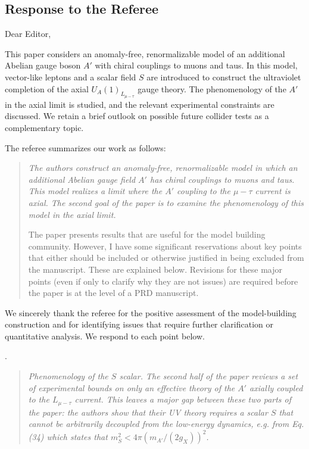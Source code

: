 \documentclass[12pt,a4paper]{article}
\begin{document}
\subsection*{Response to the Referee}

\noindent Dear Editor,

This paper considers an anomaly-free, renormalizable model of an additional Abelian
gauge boson \(A'\) with chiral couplings to muons and taus. In this model, vector-like
leptons and a scalar field \(S\) are introduced to construct the ultraviolet completion
of the axial \(U_A(1)_{L_{\mu-\tau}}\) gauge theory. The phenomenology of the \(A'\) in
the axial limit is studied, and the relevant experimental constraints are discussed.
We retain a brief outlook on possible future collider tests as a complementary topic.

The referee summarizes our work as follows:

\begin{quote}
\itshape
The authors construct an anomaly-free, renormalizable model in which an additional Abelian gauge field \(A'\) has chiral couplings to muons and taus. This model realizes a limit where the \(A'\) coupling to the \(\mu-\tau\) current is axial. The second goal of the paper is to examine the phenomenology of this model in the axial limit.

The paper presents results that are useful for the model building community. However, I have some significant reservations about key points that either should be included or otherwise justified in being excluded from the manuscript. These are explained below. Revisions for these major points (even if only to clarify why they are not issues) are required before the paper is at the level of a PRD manuscript.
\end{quote}

We sincerely thank the referee for the positive assessment of the model-building construction and for identifying issues that require further clarification or quantitative analysis. We respond to each point below.

\medskip
{}. \begin{quote}\itshape
Phenomenology of the \(S\) scalar. The second half of the paper reviews a set of experimental bounds on only an effective theory of the \(A'\) axially coupled to the \(L_{\mu-\tau}\) current. This leaves a major gap between these two parts of the paper: the authors show that their UV theory requires a scalar \(S\) that cannot be arbitrarily decoupled from the low-energy dynamics, e.g. from Eq. (34) which states that \(m_S^2 < 4\pi\left(m_{A'}/(2g_X)\right)^2\).\end{quote}
\end{document}
